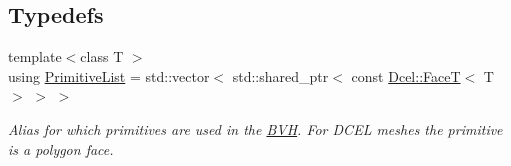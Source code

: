 \subsection*{Typedefs}
\begin{DoxyCompactItemize}
\item 
\mbox{\label{namespaceDcel_a69f60bf0111d66715bf4f7a8e22645e6}} 
{\footnotesize template$<$class T $>$ }\\using \hyperlink{namespaceDcel_a69f60bf0111d66715bf4f7a8e22645e6}{Primitive\+List} = std\+::vector$<$ std\+::shared\+\_\+ptr$<$ const \hyperlink{classDcel_1_1FaceT}{Dcel\+::\+FaceT}$<$ T $>$ $>$ $>$
\begin{DoxyCompactList}\small\item\em Alias for which primitives are used in the \hyperlink{namespaceBVH}{B\+VH}. For D\+C\+EL meshes the primitive is a polygon face. \end{DoxyCompactList}\end{DoxyCompactItemize}
